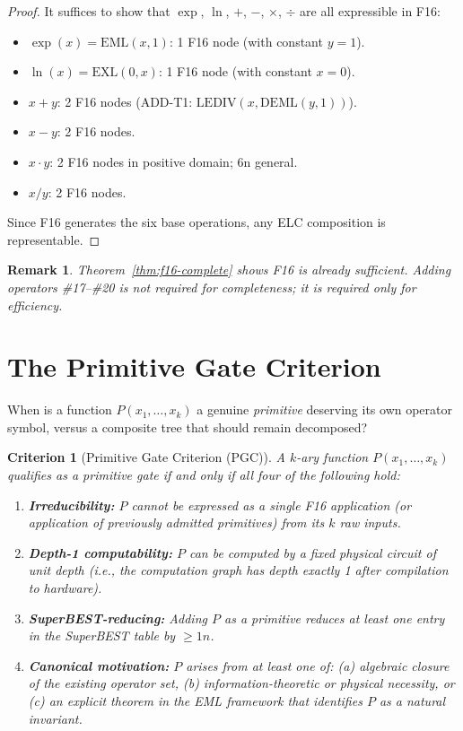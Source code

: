 \documentclass[11pt]{article}
\newtheorem{remark}[theorem]{Remark}
\newtheorem{criterion}[theorem]{Criterion}
\begin{document}
\begin{proof}
It suffices to show that $\exp$, $\ln$, $+$, $-$, $\times$, $\div$ are all
expressible in F16:
\begin{itemize}
  \item $\exp(x) = \mathrm{EML}(x,1)$: 1 F16 node (with constant $y=1$).
  \item $\ln(x) = \mathrm{EXL}(0,x)$: 1 F16 node (with constant $x=0$).
  \item $x+y$: 2 F16 nodes (ADD-T1: $\mathrm{LEDIV}(x, \mathrm{DEML}(y,1))$).
  \item $x-y$: 2 F16 nodes.
  \item $x \cdot y$: 2 F16 nodes in positive domain; 6n general.
  \item $x/y$: 2 F16 nodes.
\end{itemize}
Since F16 generates the six base operations, any ELC composition is representable.
\end{proof}

\begin{remark}
Theorem~\ref{thm:f16-complete} shows F16 is already \emph{sufficient}.
Adding operators \#17--\#20 is not required for completeness; it is
required only for \emph{efficiency}.
\end{remark}

\section{The Primitive Gate Criterion}
\label{sec:criterion}

When is a function $P(x_1,\ldots,x_k)$ a genuine \emph{primitive} deserving
its own operator symbol, versus a composite tree that should remain decomposed?

\begin{criterion}[Primitive Gate Criterion (PGC)]
\label{crit:pgc}
A $k$-ary function $P(x_1,\ldots,x_k)$ qualifies as a \emph{primitive gate} if
and only if all four of the following hold:
\begin{enumerate}
  \item \textbf{Irreducibility:} $P$ cannot be expressed as a single F16 application
        (or application of previously admitted primitives) from its $k$ raw inputs.
  \item \textbf{Depth-1 computability:} $P$ can be computed by a fixed physical
        circuit of unit depth (i.e., the computation graph has depth exactly 1
        after compilation to hardware).
  \item \textbf{SuperBEST-reducing:} Adding $P$ as a primitive reduces at least
        one entry in the SuperBEST table by $\geq 1n$.
  \item \textbf{Canonical motivation:} $P$ arises from at least one of:
        (a) algebraic closure of the existing operator set,
        (b) information-theoretic or physical necessity, or
        (c) an explicit theorem in the EML framework that identifies $P$
            as a natural invariant.
\end{enumerate}
\end{criterion}
\end{document}

